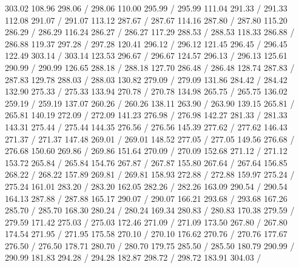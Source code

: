 { 303.02 108.96 298.06 /
 298.06 110.00 295.99 /
 295.99 111.04 291.33 /
 291.33 112.08 291.07 /
 291.07 113.12 287.67 /
 287.67 114.16 287.80 /
 287.80 115.20 286.29 /
 286.29 116.24 286.27 /
 286.27 117.29 288.53 /
 288.53 118.33 286.88 /
 286.88 119.37 297.28 /
 297.28 120.41 296.12 /
 296.12 121.45 296.45 /
 296.45 122.49 303.14 /
 303.14 123.53 296.67 /
 296.67 124.57 296.13 /
 296.13 125.61 290.99 /
 290.99 126.65 288.18 /
 288.18 127.70 286.48 /
 286.48 128.74 287.83 /
 287.83 129.78 288.03 /
 288.03 130.82 279.09 /
 279.09 131.86 284.42 /
 284.42 132.90 275.33 /
 275.33 133.94 270.78 /
 270.78 134.98 265.75 /
 265.75 136.02 259.19 /
 259.19 137.07 260.26 /
 260.26 138.11 263.90 /
 263.90 139.15 265.81 /
 265.81 140.19 272.09 /
 272.09 141.23 276.98 /
 276.98 142.27 281.33 /
 281.33 143.31 275.44 /
 275.44 144.35 276.56 /
 276.56 145.39 277.62 /
 277.62 146.43 271.37 /
 271.37 147.48 269.01 /
 269.01 148.52 277.05 /
 277.05 149.56 276.68 /
 276.68 150.60 269.86 /
 269.86 151.64 270.09 /
 270.09 152.68 271.12 /
 271.12 153.72 265.84 /
 265.84 154.76 267.87 /
 267.87 155.80 267.64 /
 267.64 156.85 268.22 /
 268.22 157.89 269.81 /
 269.81 158.93 272.88 /
 272.88 159.97 275.24 /
 275.24 161.01 283.20 /
 283.20 162.05 282.26 /
 282.26 163.09 290.54 /
 290.54 164.13 287.88 /
 287.88 165.17 290.07 /
 290.07 166.21 293.68 /
 293.68 167.26 285.70 /
 285.70 168.30 280.24 /
 280.24 169.34 280.83 /
 280.83 170.38 279.59 /
 279.59 171.42 275.03 /
 275.03 172.46 271.09 /
 271.09 173.50 267.80 /
 267.80 174.54 271.95 /
 271.95 175.58 270.10 /
 270.10 176.62 270.76 /
 270.76 177.67 276.50 /
 276.50 178.71 280.70 /
 280.70 179.75 285.50 /
 285.50 180.79 290.99 /
 290.99 181.83 294.28 /
 294.28 182.87 298.72 /
 298.72 183.91 304.03 /
}
